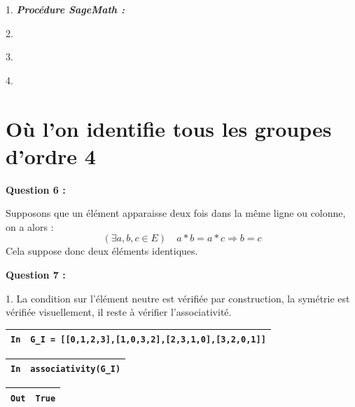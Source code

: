 \documentclass[titlepage]{article}
\begin{document}
    1. \emph{\textbf{Procédure SageMath :}}

    

    2.

    3.

    4.
    \section{Où l’on identifie tous les groupes d’ordre 4}
    \textbf{Question 6 :}

    Supposons que un élément apparaisse deux fois dans la même ligne ou colonne, on a alors :
    \[(\exists a, b, c \in E) \quad a*b=a*c \Longrightarrow b = c\]
    Cela suppose donc deux éléments identiques.\newline

    \textbf{Question 7 :}

    1. La condition sur l'élément neutre est vérifiée par construction, la symétrie est vérifiée visuellement, il reste à vérifier l'associativité.\newline
    
    \begin{tabularx}{11.5cm}{|p{0.60cm}|X|}
        \hline
        \verb|In|
        & 
        \verb|G_I = [[0,1,2,3],[1,0,3,2],[2,3,1,0],[3,2,0,1]]|
        \\
        \hline
    \end{tabularx}\newline
    \begin{tabularx}{11.5cm}{|p{0.60cm}|X|}
        \hline
        \verb|In|
        & 
        \verb|associativity(G_I)|
        \\
        \hline
    \end{tabularx}\newline
    \begin{tabularx}{11.5cm}{|p{0.60cm}|X|}
        \hline
        \verb|Out|
        & 
        \verb|True|
        \\
        \hline
    \end{tabularx}\newline\newline
\end{document}
